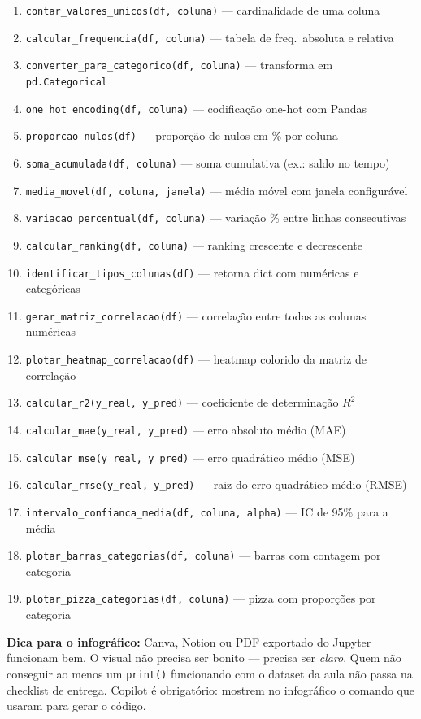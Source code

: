 \begin{BoardBox}
\begin{enumerate}
  \item \texttt{contar\_valores\_unicos(df, coluna)} — cardinalidade de uma coluna
  \item \texttt{calcular\_frequencia(df, coluna)} — tabela de freq.\ absoluta e relativa
  \item \texttt{converter\_para\_categorico(df, coluna)} — transforma em \texttt{pd.Categorical}
  \item \texttt{one\_hot\_encoding(df, coluna)} — codificação one-hot com Pandas
  \item \texttt{proporcao\_nulos(df)} — proporção de nulos em \% por coluna
  \item \texttt{soma\_acumulada(df, coluna)} — soma cumulativa (ex.: saldo no tempo)
  \item \texttt{media\_movel(df, coluna, janela)} — média móvel com janela configurável
  \item \texttt{variacao\_percentual(df, coluna)} — variação \% entre linhas consecutivas
  \item \texttt{calcular\_ranking(df, coluna)} — ranking crescente e decrescente
  \item \texttt{identificar\_tipos\_colunas(df)} — retorna dict com numéricas e categóricas
  \item \texttt{gerar\_matriz\_correlacao(df)} — correlação entre todas as colunas numéricas
  \item \texttt{plotar\_heatmap\_correlacao(df)} — heatmap colorido da matriz de correlação
  \item \texttt{calcular\_r2(y\_real, y\_pred)} — coeficiente de determinação $R^2$
  \item \texttt{calcular\_mae(y\_real, y\_pred)} — erro absoluto médio (MAE)
  \item \texttt{calcular\_mse(y\_real, y\_pred)} — erro quadrático médio (MSE)
  \item \texttt{calcular\_rmse(y\_real, y\_pred)} — raiz do erro quadrático médio (RMSE)
  \item \texttt{intervalo\_confianca\_media(df, coluna, alpha)} — IC de 95\% para a média
  \item \texttt{plotar\_barras\_categorias(df, coluna)} — barras com contagem por categoria
  \item \texttt{plotar\_pizza\_categorias(df, coluna)} — pizza com proporções por categoria
\end{enumerate}
\end{BoardBox}

\begin{NoteBox}
\textbf{Dica para o infográfico:} Canva, Notion ou PDF exportado do Jupyter
funcionam bem. O visual não precisa ser bonito — precisa ser \emph{claro}.
Quem não conseguir ao menos um \texttt{print()} funcionando com o dataset da
aula não passa na checklist de entrega. Copilot é obrigatório: mostrem no
infográfico o comando que usaram para gerar o código.
\end{NoteBox}

